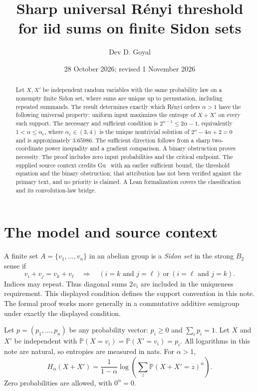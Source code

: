 \documentclass[11pt,a4paper]{article}
\title{Sharp universal R\'enyi threshold\\for iid sums on finite Sidon sets}
\author{Dev D. Goyal}
\date{28 October 2026; revised 1 November 2026}
\newcommand{\crit}{\alpha_{\mathrm c}}
\begin{document}
\maketitle

\begin{abstract}
Let $X,X'$ be independent random variables with the same probability law on a
nonempty finite Sidon set, where sums are unique up to permutation, including
repeated summands. The result determines exactly which R\'enyi orders $\alpha>1$ have
the following universal property: uniform input maximizes the entropy of
$X+X'$ on every such support. The necessary and sufficient condition is
$2^{\alpha-1}\le 2\alpha-1$, equivalently $1<\alpha\le\crit$, where
$\crit\in(3,4)$ is the unique nontrivial solution of
$2^\alpha-4\alpha+2=0$ and is approximately $3.65986$.
The sufficient direction follows from a sharp two-coordinate power inequality
and a gradient comparison. A binary obstruction proves necessity. The proof includes zero input probabilities and the critical endpoint.
The supplied source context credits Gu~\cite{Gu} with an earlier sufficient
bound, the threshold equation and the binary obstruction; that attribution
has not been verified against the primary text, and no priority is claimed.
A Lean formalization covers the classification and its convolution-law bridge.
\end{abstract}

\section{The model and source context}

A finite set $A=\{v_1,\ldots,v_n\}$ in an abelian group is a \emph{Sidon set}
in the strong $B_2$ sense if
\[
v_i+v_j=v_k+v_\ell
\quad\Longrightarrow\quad
(i=k\text{ and }j=\ell)\ \text{or}\ (i=\ell\text{ and }j=k).
\]
Indices may repeat. Thus diagonal sums $2v_i$ are included in the uniqueness
requirement. This displayed condition defines the support convention in this note.
The formal proof works more generally in a commutative additive semigroup
under exactly the displayed condition.

Let $p=(p_1,\ldots,p_n)$ be any probability vector:
$p_i\ge0$ and $\sum_i p_i=1$. Let $X$ and $X'$ be independent with
$\mathbb P(X=v_i)=\mathbb P(X'=v_i)=p_i$. All logarithms in this note are
natural, so entropies are measured in nats. For $\alpha>1$,
\[
H_\alpha(X+X')=
\frac{1}{1-\alpha}\log\!\left(\sum_z\mathbb P(X+X'=z)^\alpha\right).
\]
Zero probabilities are allowed, with $0^\alpha=0$.
\end{document}
